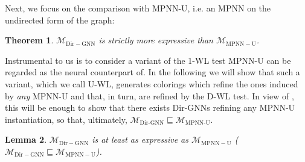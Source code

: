 \documentclass{article}
\newcommand\oursacro{Dir-GNN}
\theoremstyle{plain}
\newtheorem{theorem}{Theorem}[section]
\newtheorem{lemma}[theorem]{Lemma}
\theoremstyle{definition}
\theoremstyle{remark}
\begin{document}
 
Next, we focus on the comparison with MPNN-U, i.e. an MPNN on the undirected form of the graph: 

\begin{theorem}\label{thm:dirgnn-strictly-more-expressive-than-mpnn-u}
    $\mathcal{M}_\mathrm{\oursacro{}}$ is strictly more expressive than $\mathcal{M}_\mathrm{MPNN-U}$.
\end{theorem}

Instrumental to us is to consider a variant of the 1-WL test MPNN-U can be regarded as the neural counterpart of. In the following we will show that such a variant, which we call U-WL, generates colorings which refine the ones induced by \emph{any} MPNN-U and that, in turn, are refined by the D-WL test. In view of , this will be enough to show that there exists Dir-GNNs refining any MPNN-U instantiation, so that, ultimately, $\mathcal{M}_{\textrm{Dir-GNN}} \sqsubseteq \mathcal{M}_{\textrm{MPNN-U}}$.

\begin{lemma}\label{lemma:dirgnn-at-least-as-expressive-as-mpnn-u}
    $\mathcal{M}_\mathrm{\oursacro{}}$ is at least as expressive as $\mathcal{M}_\mathrm{MPNN-U}$ ($\mathcal{M}_\mathrm{\oursacro{}} \sqsubseteq \mathcal{M}_\mathrm{MPNN-U}$). 
\end{lemma}
\end{document}
